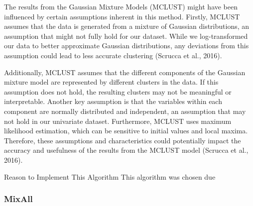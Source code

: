 \documentclass[11pt, a4paper]{article}
\begin{document}
The results from the Gaussian Mixture Models (MCLUST) might have been influenced by certain assumptions inherent in this method. Firstly, MCLUST assumes that the data is generated from a mixture of Gaussian distributions, an assumption that might not fully hold for our dataset. While we log-transformed our data to better approximate Gaussian distributions, any deviations from this assumption could lead to less accurate clustering (Scrucca et al., 2016).
\par
Additionally, MCLUST assumes that the different components of the Gaussian mixture model are represented by different clusters in the data. If this assumption does not hold, the resulting clusters may not be meaningful or interpretable. Another key assumption is that the variables within each component are normally distributed and independent, an assumption that may not hold in our univariate dataset. Furthermore, MCLUST uses maximum likelihood estimation, which can be sensitive to initial values and local maxima. Therefore, these assumptions and characteristics could potentially impact the accuracy and usefulness of the results from the MCLUST model (Scrucca et al., 2016).

Reason to Implement This Algorithm
This algorithm was chosen due 




\subsubsection{MixAll}
\end{document}
